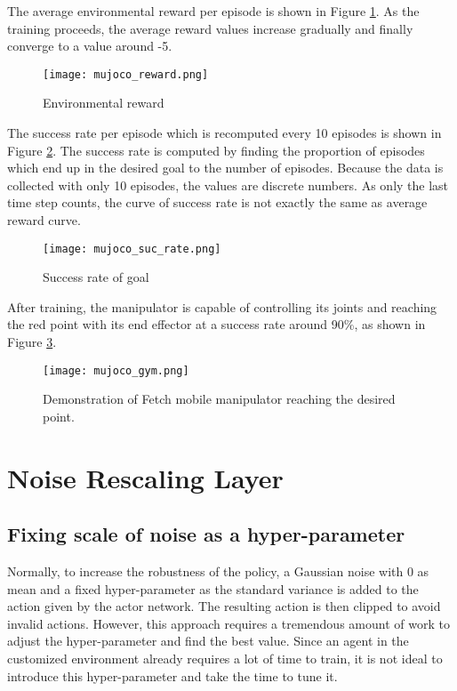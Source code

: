 \documentclass[a4paper, 12pt]{report}
\begin{document}
        The average environmental reward per episode is shown in Figure \ref{mujocoreward}. As the training proceeds, the average reward values increase gradually and finally converge to a value around -5.

        \begin{figure}[H]
        \centering
        \texttt{[image: mujoco\_reward.png]}
        \caption{Environmental reward}
            \label{mujocoreward}
        \end{figure}

        The success rate per episode which is recomputed every 10 episodes is shown in Figure \ref{mujocosuc}. The success rate is computed by finding the proportion of episodes which end up in the desired goal to the number of episodes. Because the data is collected with only 10 episodes, the values are discrete numbers. As only the last time step counts, the curve of success rate is not exactly the same as average reward curve.

        \begin{figure}[H]
        \centering
        \texttt{[image: mujoco\_suc\_rate.png]}
        \caption{Success rate of goal}
            \label{mujocosuc}
        \end{figure}

        After training, the manipulator is capable of controlling its joints and reaching the red point with its end effector at a success rate around 90\%, as shown in Figure \ref{mujoco_gym}.
        \begin{figure}[H]
        \centering
        \texttt{[image: mujoco\_gym.png]}
        \caption{Demonstration of Fetch mobile manipulator reaching the desired point.}
            \label{mujoco_gym}
        \end{figure}

\chapter {Noise Rescaling Layer}

    \section{Fixing scale of noise as a hyper-parameter}

    Normally, to increase the robustness of the policy, a Gaussian noise with 0 as mean and a fixed hyper-parameter as the standard variance is added to the action given by the actor network. The resulting action is then clipped to avoid invalid actions. However, this approach requires a tremendous amount of work to adjust the hyper-parameter and find the best value. Since an agent in the customized environment already requires a lot of time to train, it is not ideal to introduce this hyper-parameter and take the time to tune it.
\end{document}
